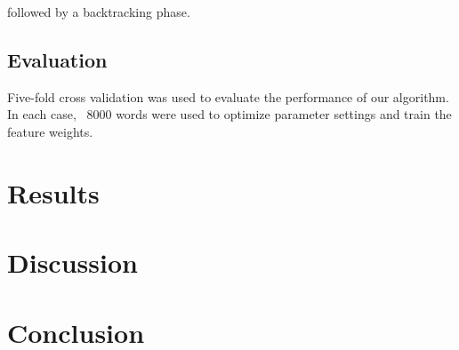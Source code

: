 \documentclass[10pt,twocolumn,letterpaper]{article}
\begin{document}
 followed by a backtracking phase.


\subsection{Evaluation}
Five-fold cross validation was used to evaluate the performance of our algorithm.  In each case, ~8000 words were used to optimize parameter settings and train the feature weights. 



\section{Results}
\section{Discussion}
\section{Conclusion}



{\small


}
\end{document}
